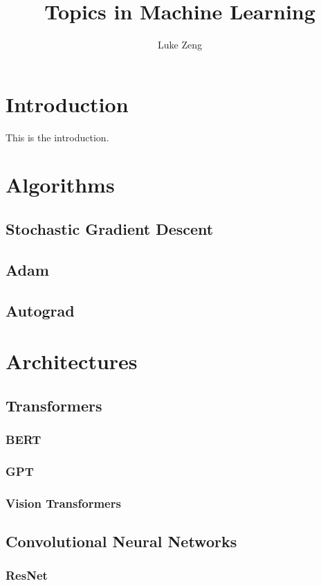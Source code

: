\documentclass[a4paper]{article}
\title{Topics in Machine Learning}
\author{Luke Zeng}
\date{}
\begin{document}
\maketitle

\tableofcontents
\newpage

\section{Introduction}
This is the introduction.

\section{Algorithms}

\subsection{Stochastic Gradient Descent}
\subsection{Adam}
\subsection{Autograd}


\section{Architectures}

\subsection{Transformers}
\subsubsection{BERT}
\subsubsection{GPT}
\subsubsection{Vision Transformers}

\subsection{Convolutional Neural Networks}
\subsubsection{ResNet}
\end{document}
